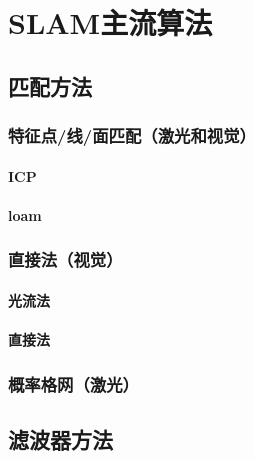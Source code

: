 \section{SLAM主流算法}
\subsection{匹配方法}
\subsubsection{特征点/线/面匹配（激光和视觉）}
\paragraph{ICP}
\paragraph{loam}
\subsubsection{直接法（视觉）}
\paragraph{光流法}
\paragraph{直接法}
\subsubsection{概率格网（激光）}
\subsection{滤波器方法}
